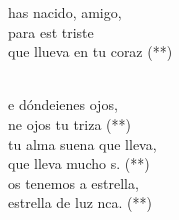 \begin{cancion}%
	\begin{chorus}%
	has nacido, amigo,\\
	para est triste\\
	que llueva en tu coraz (**)\\
	\end{chorus}%
	\jump\\
	e dóndeienes ojos,\\
	ne ojos tu triza (**)\\
	tu alma suena  que lleva,\\
	que lleva mucho s. (**)\\
	os tenemos a estrella,\\
	 estrella de luz nca. (**)\\
\end{cancion}%
